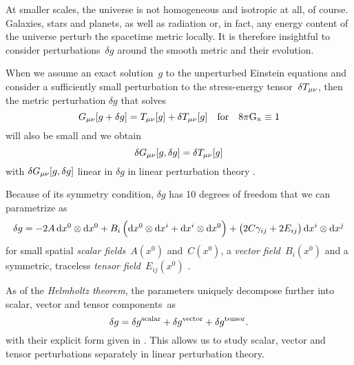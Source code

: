 At smaller scales, the universe is not homogeneous and isotropic at all, of course. Galaxies, stars and planets, as well as radiation or, in fact, any energy content of the universe perturb the spacetime metric locally. It is therefore insightful to consider perturbations~\(\delta g\) around the smooth \FLRW{} metric and their evolution.

When we assume an exact solution~\(g\) to the unperturbed Einstein equations and consider a sufficiently small perturbation to the stress-energy tensor~\(\delta T_{\mu \nu}\), then the metric perturbation \(\delta g\) that solves
\begin{equation}
	G_{\mu \nu}[g + \delta g] = T_{\mu \nu}[g] + \delta T_{\mu \nu}[g] \quad \text{for} \quad 8\pi\mathrm{G}_\textnormal{\tiny{N}} \equiv 1
\end{equation}
will also be small and we obtain
\begin{equation}\label{eq:perturbed_einstein_eqns}
	\delta G_{\mu \nu}[g,\delta g] = \delta T_{\mu \nu}[g]
\end{equation}
with \(\delta G_{\mu \nu}[g,\delta g]\) linear in \(\delta g\) in linear perturbation theory \autocite{Schuller}.

Because of its symmetry condition, \(\delta g\) has 10 degrees of freedom that we can parametrize as
\begin{align}
	\delta g = -2A \dxdx{0}{0} + B_i\del{\dxdx{0}{i} + \dxdx{i}{0}} + \del{2C\gamma_{ij} + 2E_{ij}}\dxdx{i}{j}
\end{align}
for small spatial \emph{scalar fields}~\(A(x^0)\) and~\(C(x^0)\), a \emph{vector field}~\(B_i(x^0)\) and a symmetric, traceless \emph{tensor field}~\(E_{ij}(x^0)\) \autocite{Schuller}.

As of the \emph{Helmholtz theorem}, the parameters uniquely decompose further into scalar, vector and tensor components~as~\autocite{Dodelson,Weinberg}
\begin{equation}
	\delta g = \delta g^{\mathrm{scalar}} + \delta g^{\mathrm{vector}} + \delta g^{\mathrm{tensor}}
	\mathpunct{.}
\end{equation}
with their explicit form given in . This allows us to study scalar, vector and tensor perturbations separately in linear perturbation theory.

